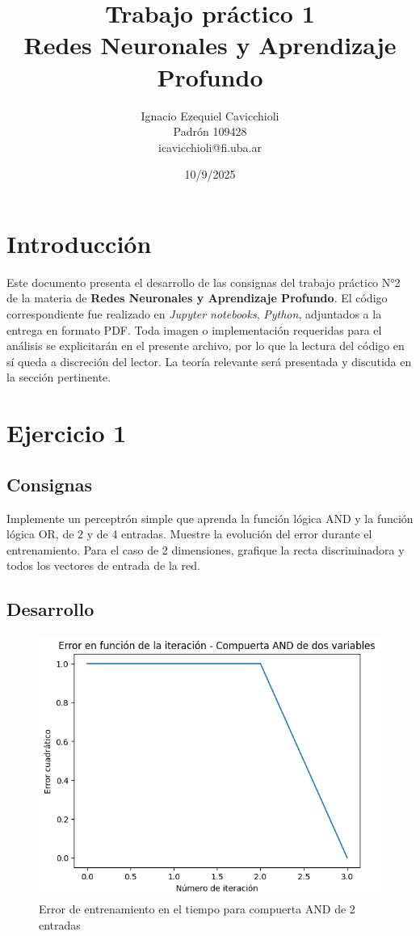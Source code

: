 \documentclass[11pt]{article} %
\title{Trabajo práctico 1\\ Redes Neuronales y Aprendizaje Profundo}
\author{Ignacio Ezequiel Cavicchioli\\Padrón 109428\\icavicchioli@fi.uba.ar}
\date{10/9/2025} %
\begin{document}
\maketitle

\tableofcontents



\section{Introducción}

Este documento presenta el desarrollo de las consignas del trabajo práctico N°2 de la materia de \textbf{Redes Neuronales y Aprendizaje Profundo}.  El código correspondiente fue realizado en  \textit{Jupyter notebooks}, \textit{Python}, adjuntados a la entrega en formato PDF. Toda imagen o implementación requeridas para el análisis se explicitarán en el presente archivo, por lo que la lectura del código en sí queda a discreción del lector. La teoría relevante será presentada y discutida en la sección pertinente.


\newpage

\section{Ejercicio 1}

\subsection{Consignas}

Implemente un perceptrón simple que aprenda la función lógica AND y la función lógica OR, de 2 y de 4 entradas. Muestre la evolución del error durante el entrenamiento. Para el caso de 2 dimensiones, grafique la recta discriminadora y todos los vectores de entrada de la red.

\subsection{Desarrollo}


\begin{figure}[h!]
	\centering
	\includegraphics[width=0.7\linewidth]{../imgs/ej1/AND2err}
	\caption[]{Error de entrenamiento en el tiempo para compuerta AND de 2 entradas}
	\label{fig:and2err}
\end{figure}
\end{document}

